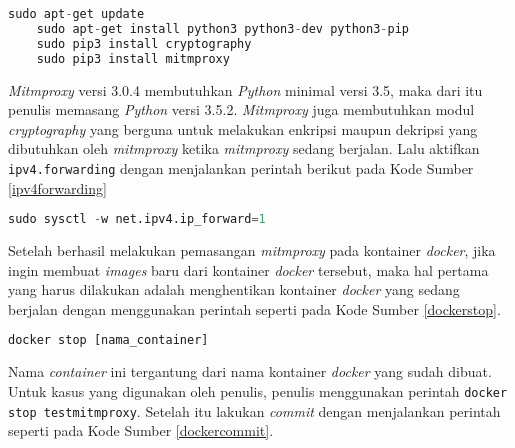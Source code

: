 	\newline
	\begin{minipage}{\linewidth}
	\begin{lstlisting}[caption=Perintah untuk Pemasangan \textit{Mitmproxy},language=Python,label=installmitmproxy]
	sudo apt-get update
	sudo apt-get install python3 python3-dev python3-pip
	sudo pip3 install cryptography
	sudo pip3 install mitmproxy
	\end{lstlisting}
	\end{minipage}
	
	\textit{Mitmproxy} versi 3.0.4 membutuhkan \textit{Python} minimal versi 3.5, maka dari itu penulis memasang \textit{Python} versi 3.5.2. \textit{Mitmproxy} juga membutuhkan modul \textit{cryptography} yang berguna untuk melakukan enkripsi maupun dekripsi yang dibutuhkan oleh \textit{mitmproxy} ketika \textit{mitmproxy} sedang berjalan. Lalu aktifkan \texttt{ipv4.forwarding} dengan menjalankan perintah berikut pada Kode Sumber \ref{ipv4forwarding}\\
	\newline
	\begin{minipage}{\linewidth}
	\begin{lstlisting}[caption=Perintah untuk Mengaktifkan \textit{ipv4.forwarding},language=Python,label=ipv4forwarding]
  sudo sysctl -w net.ipv4.ip_forward=1
	\end{lstlisting}
	\end{minipage}
	\indent Setelah berhasil melakukan pemasangan \textit{mitmproxy} pada kontainer \textit{docker}, jika ingin membuat \textit{images} baru dari kontainer \textit{docker} tersebut, maka hal pertama yang harus dilakukan adalah menghentikan kontainer \textit{docker} yang sedang berjalan dengan menggunakan perintah seperti pada Kode Sumber \ref{dockerstop}.
	\newline
	\begin{minipage}{\linewidth}
	\begin{lstlisting}[caption=Perintah untuk Menghentikan Kontainer \textit{Docker},language=Python,label=dockerstop]
	docker stop [nama_container]
	\end{lstlisting}
	\end{minipage}
	Nama \textit{container} ini tergantung dari nama kontainer \textit{docker} yang sudah dibuat. Untuk kasus yang digunakan oleh penulis, penulis menggunakan perintah \texttt{docker stop testmitmproxy}. Setelah itu lakukan \textit{commit} dengan menjalankan perintah seperti pada Kode Sumber \ref{dockercommit}.
	\newline
